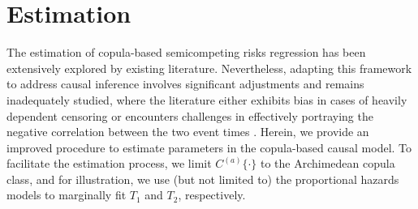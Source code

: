 \documentclass[useAMS,usenatbib,referee]{biom}
\theoremstyle{plain}
\begin{document}
\section{Estimation}\label{section:estimation}
The estimation of copula-based semicompeting risks regression has been extensively explored by existing literature. %
Nevertheless, adapting this framework to address causal inference involves significant adjustments and remains inadequately studied, where the literature either exhibits bias in cases of heavily dependent censoring or encounters challenges in effectively portraying the negative correlation between the two event times \citep{peterson1976bound,varadhan2014}.
Herein, we provide an improved procedure to estimate parameters in the copula-based causal model. %
To facilitate the estimation process,
we limit $C^{(a)}\{\cdot\}$ to the Archimedean copula class, and for illustration, we use (but not limited to) the proportional hazards models to marginally fit $T_1$ and $T_2$, respectively. 
\end{document}
